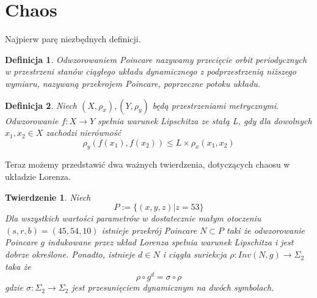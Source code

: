 \documentclass[12pt]{report}
\newtheorem{theorem}{Twierdzenie}
\newtheorem{definition}{Definicja}
\begin{document}
	\section{Chaos}
	Najpierw parę niezbędnych definicji.
	\begin{definition}
		Odwzorowaniem Poincare nazywamy przecięcie orbit periodycznych w przestrzeni stanów ciągłego układu dynamicznego z podprzestrzenią niższego wymiaru, nazywaną przekrojem Poincare, poprzeczne potoku układu.
	\end{definition}
	\begin{definition}
		Niech $(X, \rho_x), (Y, \rho_y)$ będą przestrzeniami metrycznymi. Odwzorowanie $f: X \to Y$ spełnia warunek Lipschitza ze stałą L, gdy dla dowolnych $x_1, x_2 \in X$ zachodzi nierówność
			\[ \rho_y(f(x_1), f(x_2)) \le L \times \rho_x(x_1, x_2) \]
	\end{definition}
	Teraz możemy przedstawić dwa ważnych twierdzenia, dotyczących chaosu w układzie Lorenza.
	\begin{theorem}
		Niech
			\[ P := \{(x, y, z) | z = 53\} \]
		Dla wszystkich wartości parametrów w dostatecznie małym otoczeniu $(s, r, b) = (45, 54, 10)$ istnieje przekrój Poincare $N \subset P$ taki że odwzorowanie Poincare $g$ indukowane przez układ Lorenza spełnia warunek Lipschitza i jest dobrze określone. Ponadto, istnieje $d \in N$ i ciągła suriekcja $\rho: Inv(N, g) \to \Sigma_2$ taka że
			\[ \rho \circ g^d = \sigma \circ \rho \]
		gdzie $\sigma : \Sigma_2 \to \Sigma_2$ jest przesunięciem dynamicznym na dwóch symbolach. \cite{MM}
	\end{theorem}
\end{document}
